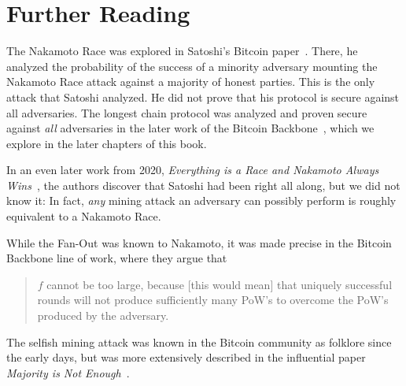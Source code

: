 \begin{problems}


%
\end{problems}

\section*{Further Reading}

The Nakamoto Race was explored in Satoshi's Bitcoin paper~\cite{bitcoin}. There, he analyzed the probability of
the success of a minority adversary mounting the Nakamoto Race attack against a majority of honest
parties. This is the only attack that Satoshi analyzed. He did not prove that his protocol is secure
against all adversaries. The longest chain protocol was analyzed and proven secure against \emph{all}
adversaries in the later work of the Bitcoin Backbone~\cite{backbone}, which we explore in the later chapters of this
book.

In an even later work from 2020,
\emph{Everything is a Race and Nakamoto Always Wins~\cite{nakamoto-wins}},
the authors discover that Satoshi had been right all along, but we did not know it:
In fact, \emph{any} mining attack an adversary can possibly perform is roughly equivalent
to a Nakamoto Race.

While the Fan-Out was known to Nakamoto, it was made precise in the Bitcoin Backbone line of
work, where they argue that

\begin{quote}
$f$ cannot be too large, because [this would mean] that uniquely
successful rounds will not produce sufficiently many PoW's to overcome the PoW's
produced by the adversary.
\end{quote}

The selfish mining attack was known in the Bitcoin community as folklore since the early days,
but was more extensively described in the influential paper \emph{Majority is Not Enough}~\cite{selfish}.